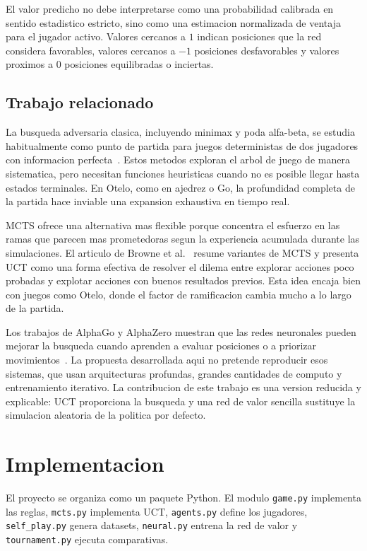 \documentclass[conference,a4paper]{IEEEtran}
\begin{document}
El valor predicho no debe interpretarse como una probabilidad calibrada en
sentido estadistico estricto, sino como una estimacion normalizada de ventaja
para el jugador activo. Valores cercanos a \(1\) indican posiciones que la red
considera favorables, valores cercanos a \(-1\) posiciones desfavorables y
valores proximos a \(0\) posiciones equilibradas o inciertas.

\subsection{Trabajo relacionado}

La busqueda adversaria clasica, incluyendo minimax y poda alfa-beta, se estudia
habitualmente como punto de partida para juegos deterministas de dos jugadores
con informacion perfecta~\cite{russell2020}. Estos metodos exploran el arbol de
juego de manera sistematica, pero necesitan funciones heuristicas cuando no es
posible llegar hasta estados terminales. En Otelo, como en ajedrez o Go, la
profundidad completa de la partida hace inviable una expansion exhaustiva en
tiempo real.

MCTS ofrece una alternativa mas flexible porque concentra el esfuerzo en las
ramas que parecen mas prometedoras segun la experiencia acumulada durante las
simulaciones. El articulo de Browne et al.~\cite{browne2012} resume variantes
de MCTS y presenta UCT como una forma efectiva de resolver el dilema entre
explorar acciones poco probadas y explotar acciones con buenos resultados
previos. Esta idea encaja bien con juegos como Otelo, donde el factor de
ramificacion cambia mucho a lo largo de la partida.

Los trabajos de AlphaGo y AlphaZero muestran que las redes neuronales pueden
mejorar la busqueda cuando aprenden a evaluar posiciones o a priorizar
movimientos~\cite{silver2016, silver2017}. La propuesta desarrollada aqui no
pretende reproducir esos sistemas, que usan arquitecturas profundas, grandes
cantidades de computo y entrenamiento iterativo. La contribucion de este trabajo
es una version reducida y explicable: UCT proporciona la busqueda y una red de
valor sencilla sustituye la simulacion aleatoria de la politica por defecto.

\section{Implementacion}

El proyecto se organiza como un paquete Python. El modulo \texttt{game.py}
implementa las reglas, \texttt{mcts.py} implementa UCT, \texttt{agents.py}
define los jugadores, \texttt{self\_play.py} genera datasets,
\texttt{neural.py} entrena la red de valor y \texttt{tournament.py} ejecuta
comparativas.
\end{document}
